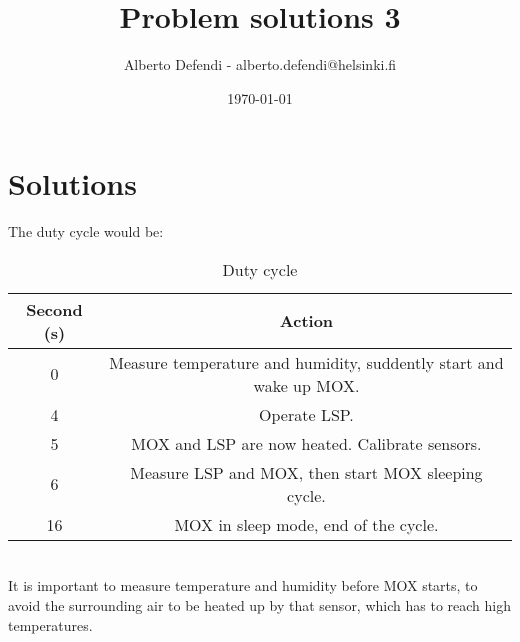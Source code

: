 \documentclass[a4paper, 12pt]{article}
\title{Problem solutions 3}
\author{Alberto Defendi - alberto.defendi@helsinki.fi}
\date{\today}
\begin{document}
\maketitle

\section{Solutions} %
\label{sec:solutions}

\begin{exercise}
The duty cycle would be:
\begin{table}[htpb]
    \centering
    \caption{Duty cycle}
    \label{tab:label}
    \begin{tabular}{c | c}
		Second (s) & Action\\
	\hline
	0 & Measure temperature and humidity, suddently start and wake up MOX.\\
	4 & Operate LSP.\\
	5 & MOX and LSP are now heated. Calibrate sensors. \\
	6 & Measure LSP and MOX, then start MOX sleeping cycle.\\
	16 & MOX in sleep mode, end of the cycle.\\
    \end{tabular}
\end{table}\\
It is important to measure temperature and humidity before MOX starts, to avoid
the surrounding air to be heated up by that sensor, which has to reach high
temperatures. 

\end{exercise}
\end{document}
